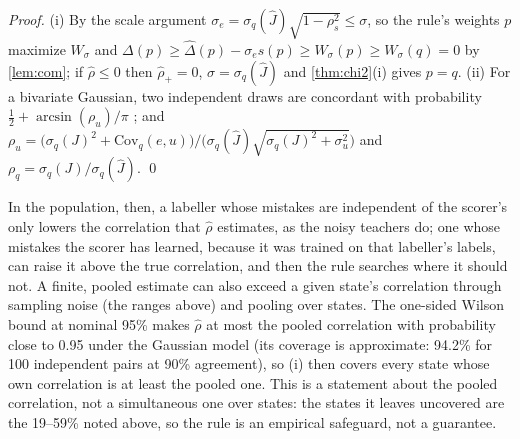 \documentclass{article}
\theoremstyle{plain}
\theoremstyle{remark}
\newcommand{\Jh}{\hat{J}}
\newcommand{\Cov}{\mathrm{Cov}}
\begin{document}
\emph{Proof.} (i) By the scale argument $\sigma_e=\sigma_q(\Jh)\sqrt{1-\rho_s^2}\le\sigma$, so the rule's weights $p$
maximize $W_\sigma$ and $\Delta(p)\ge\hat\Delta(p)-\sigma_es(p)\ge W_\sigma(p)\ge W_\sigma(q)=0$ by \cref{lem:com};
if $\hat\rho\le0$ then $\hat\rho_+=0$, $\sigma=\sigma_q(\Jh)$ and \cref{thm:chi2}(i) gives $p=q$. (ii) For a bivariate
Gaussian, two independent draws are concordant with probability $\frac12+\arcsin(\rho_u)/\pi$
\citep{kruskal1958ordinal}; and $\rho_u=\big(\sigma_q(J)^2+\Cov_q(e,u)\big)\big/\big(\sigma_q(\Jh)\sqrt{\sigma_q(J)^2+\sigma_u^2}\big)$ and
$\rho_q=\sigma_q(J)/\sigma_q(\Jh)$. \qed

In the population, then, a labeller whose mistakes are independent of the scorer's only lowers the correlation that
$\hat\rho$ estimates, as the noisy teachers do; one whose mistakes the scorer has learned, because it was trained on
that labeller's labels, can raise it above the true correlation, and then the rule searches where it should not. A
finite, pooled estimate can also exceed a given state's correlation through sampling noise (the ranges above) and
pooling over states. The one-sided Wilson bound at nominal 95\% makes $\hat\rho$ at most the pooled correlation with
probability close to 0.95 under the Gaussian model (its coverage is approximate: 94.2\% for 100 independent pairs at
90\% agreement), so (i) then covers every state whose own correlation is at least the pooled one. This is a statement about the pooled correlation, not a simultaneous one over states: the states
it leaves uncovered are the 19--59\% noted above, so the rule is an empirical safeguard, not a guarantee.
\end{document}
